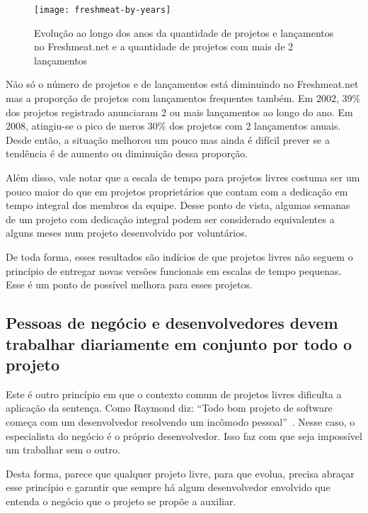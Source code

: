 \begin{figure}
  \centering
  \texttt{[image: freshmeat-by-years]}
  \caption{Evolução ao longo dos anos da quantidade de projetos e
    lançamentos no Freshmeat.net e a quantidade de projetos com mais
    de 2 lançamentos}
  \label{fig:freshmeat-by-years}
\end{figure}

Não só o número de projetos e de lançamentos está diminuindo no
Freshmeat.net mas a proporção de projetos com lançamentos frequentes
também. Em 2002, 39\% dos projetos registrado anunciaram 2 ou mais
lançamentos ao longo do ano. Em 2008, atingiu-se o pico de meros 30\%
dos projetos com 2 lançamentos anuais. Desde então, a situação
melhorou um pouco mas ainda é difícil prever se a tendência é de
aumento ou diminuição dessa proporção.

Além disso, vale notar que a escala de tempo para projetos livres
costuma ser um pouco maior do que em projetos proprietários que contam
com a dedicação em tempo integral dos membros da equipe. Desse ponto
de vista, algumas semanas de um projeto com dedicação integral podem
ser considerado equivalentes a alguns meses num projeto desenvolvido
por voluntários.

De toda forma, esses resultados são indícios de que projetos livres
não seguem o princípio de entregar novas versões funcionais em escalas
de tempo pequenas. Esse é um ponto de possível melhora para esses
projetos.

\subsection[Trabalhar com pessoas de negócio]{Pessoas de negócio e
  desenvolvedores devem trabalhar diariamente em conjunto por todo o
  projeto}


Este é outro princípio em que o contexto comum de projetos livres
dificulta a aplicação da sentença. Como Raymond diz: ``Todo bom
projeto de software começa com um desenvolvedor resolvendo um incômodo
pessoal''~\cite{Raymond1999}. Nesse caso, o especialista do negócio é
o próprio desenvolvedor. Isso faz com que seja impossível um trabalhar
sem o outro.

Desta forma, parece que qualquer projeto livre, para que evolua,
precisa abraçar esse princípio e garantir que sempre há algum
desenvolvedor envolvido que entenda o negócio que o projeto se propõe
a auxiliar.

